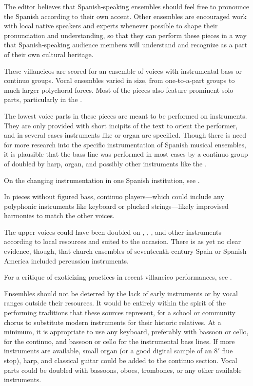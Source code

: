 
The editor believes that Spanish-speaking ensembles should feel free to
pronounce the Spanish according to their own accent.
Other ensembles are encouraged work with local native speakers and experts
whenever possible to shape their pronunciation and understanding, so that they
can perform these pieces in a way that Spanish-speaking audience members will
understand and recognize as a part of their own cultural heritage.

These villancicos are scored for an ensemble of voices with instrumental bass 
or continuo groups.
Vocal ensembles varied in size, from one-to-a-part groups to much larger 
polychoral forces.
Most of the pieces also feature prominent solo parts, particularly in the 
.

The lowest voice parts in these pieces are meant to be performed on instruments. 
They are only provided with short incipits of the text to orient the 
performer, and in several cases instruments like  or organ are specified.
Though there is need for more research into the specific instrumentation of 
Spanish musical ensembles, it is plausible that the bass line was performed in 
most cases by a continuo group of  doubled by harp, organ, and 
possibly other instruments like the .%
\begin{Footnote}
    On the changing instrumentation in one Spanish institution, see 
    \autocite{Torrente:PhD}.
\end{Footnote}
In pieces without figured bass, continuo players---which could include any
polyphonic instruments like keyboard or plucked strings---likely improvised
harmonies to match the other voices.

The upper voices could have been doubled on ,
, , and other instruments
according to local resources and suited to the occasion.
There is as yet no clear evidence, though, that church ensembles of 
seventeenth-century Spain or Spanish America included percussion instruments.%
\begin{Footnote}
  For a critique of exoticizing practices in recent villancico performances,  
  see \autocite{Baker:PerformancePostColonial}.
\end{Footnote}

Ensembles should not be deterred by the lack of early instruments or by vocal
ranges outside their resources.
It would be entirely within the spirit of the performing traditions that these
sources represent, for a school or community chorus to substitute modern
instruments for their historic relatives.
At a minimum, it is appropriate to use any keyboard, preferably with bassoon or
cello, for the continuo, and bassoon or cello for the instrumental bass lines.
If more instruments are available, small organ (or a good digital sample of an 
8$'$ flue stop), harp, and classical guitar could be added to the continuo section.
Vocal parts could be doubled with bassoons, oboes, trombones, or any other
available instruments.

